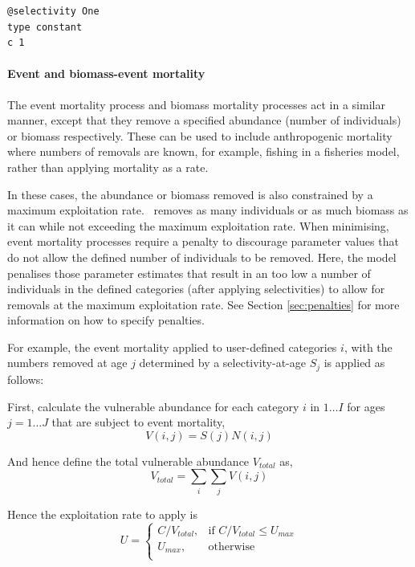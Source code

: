 {\small{\begin{verbatim}
@selectivity One
type constant
c 1
\end{verbatim}}}

\paragraph{Event and biomass-event mortality}

The event mortality process and biomass mortality processes act in a similar manner, except that they remove a specified abundance (number of individuals) or biomass respectively. These can be used to include anthropogenic mortality where numbers of removals are known, for example, fishing in a fisheries model, rather than applying mortality as a rate. 

In these cases, the abundance or biomass removed is also constrained by a maximum exploitation rate. \CNAME\ removes as many individuals or as much biomass as it can while not exceeding the maximum exploitation rate. When minimising, event mortality processes require a penalty to discourage parameter values that do not allow the defined number of individuals to be removed. Here, the model penalises those parameter estimates that result in an too low a number of individuals in the defined categories (after applying selectivities) to allow for removals at the maximum exploitation rate. See Section \ref{sec:penalties} for more information on how to specify penalties.

For example, the event mortality applied to user-defined categories $i$, with the numbers removed at age $j$ determined by a selectivity-at-age $S_j$ is applied as follows:

First, calculate the vulnerable abundance for each category $i$ in $1 \ldots I$ for ages $j = 1 \ldots J$ that are subject to event mortality,
\begin{equation}
  V(i,j) = S(j) N(i,j)
\end{equation}

And hence define the total vulnerable abundance $V_{total}$ as,
\begin{equation}
  V_{total}  = \sum\limits_i {\sum\limits_j {V(i,j)}} 
\end{equation}

Hence the exploitation rate to apply is 
\begin{equation}
U = \begin{cases}
  C/V_{total}, & \text{if $C/V_{total} \leq U_{max}$} \\
  U_{max}, & \text{otherwise}\\ 
  \end{cases} 
\end{equation}

